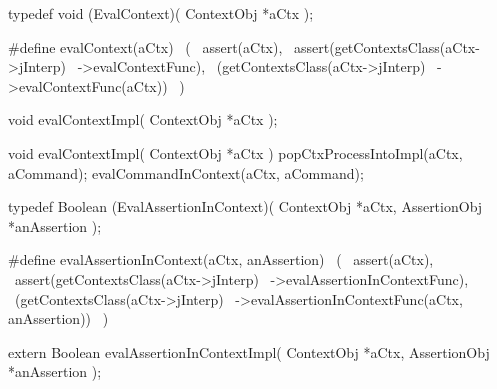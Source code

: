 \startCHeader
typedef void (EvalContext)(
  ContextObj *aCtx
);

#define evalContext(aCtx)                   \
  (                                         \
    assert(aCtx),                           \
    assert(getContextsClass(aCtx->jInterp)  \
      ->evalContextFunc),                   \
    (getContextsClass(aCtx->jInterp)        \
      ->evalContextFunc(aCtx))              \
  )
\stopCHeader

\setCHeaderStream{private}
\startCHeader
void evalContextImpl(
  ContextObj *aCtx
);
\stopCHeader
{}

\startCCode
void evalContextImpl(
  ContextObj *aCtx
) {
  popCtxProcessIntoImpl(aCtx, aCommand);
  evalCommandInContext(aCtx, aCommand);
}
\stopCCode


\startTestSuite[evalAssertionInContext]

\startCHeader
typedef Boolean (EvalAssertionInContext)(
  ContextObj   *aCtx,
  AssertionObj *anAssertion
);

#define evalAssertionInContext(aCtx, anAssertion)       \
  (                                                     \
    assert(aCtx),                                       \
    assert(getContextsClass(aCtx->jInterp)              \
      ->evalAssertionInContextFunc),                    \
    (getContextsClass(aCtx->jInterp)                    \
      ->evalAssertionInContextFunc(aCtx, anAssertion))  \
  )
\stopCHeader

\startCHeader
extern Boolean evalAssertionInContextImpl(
  ContextObj   *aCtx,
  AssertionObj *anAssertion
);
\stopCHeader
\setCHeaderStream{public}

